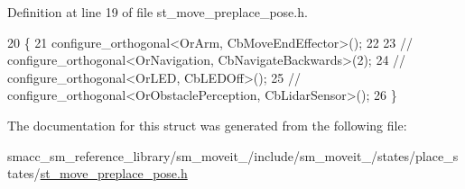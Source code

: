 Definition at line 19 of file st\+\_\+move\+\_\+preplace\+\_\+pose.\+h.


\begin{DoxyCode}
20     \{
21         configure\_orthogonal<OrArm, CbMoveEndEffector>();
22 
23         \textcolor{comment}{//   configure\_orthogonal<OrNavigation, CbNavigateBackwards>(2);}
24         \textcolor{comment}{//   configure\_orthogonal<OrLED, CbLEDOff>();}
25         \textcolor{comment}{//   configure\_orthogonal<OrObstaclePerception, CbLidarSensor>();}
26     \}
\end{DoxyCode}


The documentation for this struct was generated from the following file\+:\begin{DoxyCompactItemize}
\item 
smacc\+\_\+sm\+\_\+reference\+\_\+library/sm\+\_\+moveit\+\_/include/sm\+\_\+moveit\+\_/states/place\+\_\+states/\hyperlink{2_2include_2sm__moveit__2_2states_2place__states_2st__move__preplace__pose_8h}{st\+\_\+move\+\_\+preplace\+\_\+pose.\+h}\end{DoxyCompactItemize}
